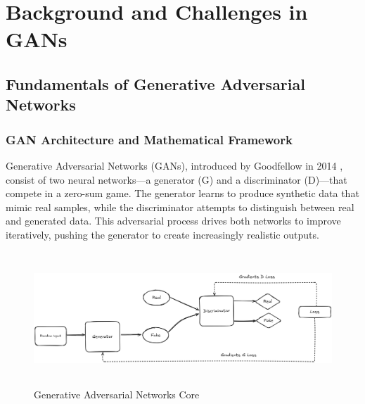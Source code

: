 \chapter{Background and Challenges in GANs}

\startcontents[chapters]


\fancyhead[LE]{\textsc{\chaptername~\thechapter}}

\section{Fundamentals of Generative Adversarial Networks}

\subsection{GAN Architecture and Mathematical Framework}

Generative Adversarial Networks (GANs), introduced by Goodfellow in 2014 \cite{ref1}, consist of two neural networks—a generator (G) and a discriminator (D)—that compete in a zero-sum game. The generator learns to produce synthetic data that mimic real samples, while the discriminator attempts to distinguish between real and generated data. This adversarial process drives both networks to improve iteratively, pushing the generator to create increasingly realistic outputs.

\begin{figure}
    \centering
    \includegraphics[height=5cm]{images/GAN_Core.png}
    \caption{Generative Adversarial Networks Core}
    \label{fig:enter-label}
\end{figure}

